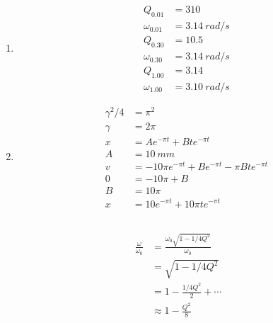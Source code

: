 \documentclass{article}
\begin{document}
\subsection{}

\begin{enumerate}
  \item

        \begin{align*}
          Q_{0.01}      & = 310               \\
          \omega_{0.01} & = \qty{3.14}{rad/s} \\
          Q_{0.30}      & = 10.5              \\
          \omega_{0.30} & = \qty{3.14}{rad/s} \\
          Q_{1.00}      & = 3.14              \\
          \omega_{1.00} & = \qty{3.10}{rad/s}
        \end{align*}

        \setcounter{enumi}{2}
  \item

        \begin{align*}
          \gamma^2 / 4 & = \pi^2                                                  \\
          \gamma       & = 2 \pi                                                  \\
          x            & = A e^{-\pi t} + B t e^{-\pi t}                          \\
          A            & = \qty{10}{mm}                                           \\
          v            & = -10 \pi e^{-\pi t} + B e^{-\pi t} - \pi B t e^{-\pi t} \\
          0            & = -10 \pi + B                                            \\
          B            & = 10 \pi                                                 \\
          x            & = 10 e^{-\pi t} + 10 \pi t e^{-\pi t}
        \end{align*}
\end{enumerate}

\subsection{}

\begin{align*}
  \frac{\omega}{\omega_0} & = \frac{\omega_0 \sqrt{1 - 1 / 4 Q^2}}{\omega_0} \\
                          & = \sqrt{1 - 1 / 4 Q^2}                           \\
                          & = 1 - \frac{1 / 4 Q^2}{2} + \cdots               \\
                          & \approx 1 - \frac{Q^2}{8}
\end{align*}
\end{document}
